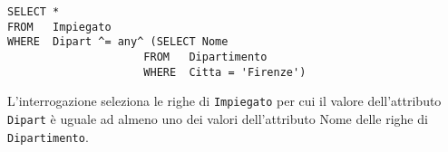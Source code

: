 \begin{lstlisting}
SELECT *
FROM   Impiegato
WHERE  Dipart ^= any^ (SELECT Nome
                     FROM   Dipartimento
                     WHERE  Citta = 'Firenze')
\end{lstlisting}

L'interrogazione seleziona le righe di \texttt{Impiegato} per cui il valore dell'attributo \texttt{Dipart} è uguale ad almeno uno dei valori dell'attributo Nome delle righe di \texttt{Dipartimento}.
